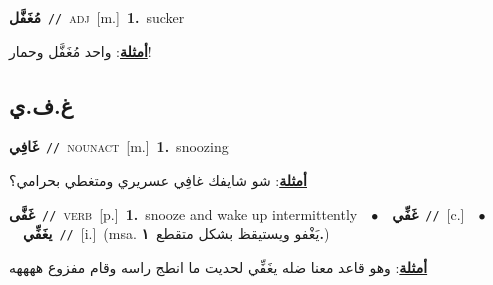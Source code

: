 \documentclass[10pt,a4paper,twoside]{article} %
\begin{document}
\begin{multicols}{2}
{\setlength\topsep{0pt}\textbf{\foreignlanguage{arabic}{مُغَفَّل}}\ {\color{gray}\texttt{//}\color{black}}\ \textsc{adj}\ [m.]\ \textbf{1.}~sucker\  \begin{flushright}\color{gray}\foreignlanguage{arabic}{\textbf{\underline{\foreignlanguage{arabic}{أمثلة}}}: واحد مُغَفَّل وحمار!}\end{flushright}\color{black}} \vspace{2mm}

\vspace{-3mm}
\subsection*{\color{blue}\foreignlanguage{arabic}{غ.ف.ي}\color{blue}{}} 

{\setlength\topsep{0pt}\textbf{\foreignlanguage{arabic}{غَافِي}}\ {\color{gray}\texttt{//}\color{black}}\ \textsc{noun\textunderscore act}\ [m.]\ \textbf{1.}~snoozing\  \begin{flushright}\color{gray}\foreignlanguage{arabic}{\textbf{\underline{\foreignlanguage{arabic}{أمثلة}}}: شو شايفك غافِي عسريري ومتغطي بحرامي؟}\end{flushright}\color{black}} \vspace{2mm}

{\setlength\topsep{0pt}\textbf{\foreignlanguage{arabic}{غَفَّى}}\ {\color{gray}\texttt{//}\color{black}}\ \textsc{verb}\ [p.]\ \textbf{1.}~snooze and wake up intermittently\ \ $\bullet$\ \ \setlength\topsep{0pt}\textbf{\foreignlanguage{arabic}{غَفِّي}}\ {\color{gray}\texttt{//}\color{black}}\ [c.]\ \ $\bullet$\ \ \setlength\topsep{0pt}\textbf{\foreignlanguage{arabic}{يغَفِّي}}\ {\color{gray}\texttt{//}\color{black}}\ [i.]\ \color{gray}(msa. \foreignlanguage{arabic}{يَغْفو ويستيقظ بشكل متقطع}~\foreignlanguage{arabic}{\textbf{١.}})\color{black}\  \begin{flushright}\color{gray}\foreignlanguage{arabic}{\textbf{\underline{\foreignlanguage{arabic}{أمثلة}}}: وهو قاعد معنا ضله يغَفِّي لحديت ما انطج راسه وقام مفزوع ههههه}\end{flushright}\color{black}} \vspace{2mm}


\end{multicols}
\end{document}
